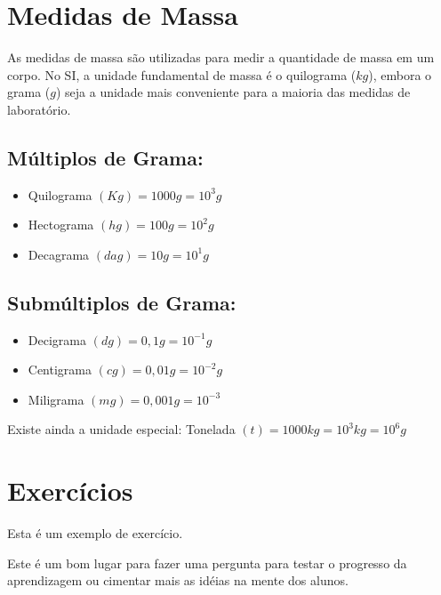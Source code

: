 \section{Medidas de Massa}
As medidas de massa são utilizadas para medir a quantidade
de massa em um corpo. No SI, a unidade fundamental de massa é
o quilograma ($kg$), embora o grama ($g$) seja a unidade mais
conveniente para a maioria das medidas de laboratório.
	\subsection{Múltiplos de Grama:}
		\begin{itemize}
		    \item Quilograma $(Kg) = 1000 g = 10^3 g$
		    \item Hectograma $(hg) = 100 g = 10^2 g$
		    \item Decagrama $(dag) = 10 g = 10^1 g$
		\end{itemize}
	
	\subsection{Submúltiplos de Grama:}
		\begin{itemize}
		    \item Decigrama $(dg) = 0,1 g = 10^{-1} g$
		    \item Centigrama $(cg) = 0,01 g = 10^{-2} g$
		    \item Miligrama $(mg) = 0,001 g = 10^{-3}$
		\end{itemize}
Existe ainda a unidade especial:
Tonelada $(t) = 1000 kg = 10^3 kg = 10^6 g$

\section{Exercícios}

Esta é um exemplo de exercício.
	\begin{exercise}
	Este é um bom lugar para fazer uma pergunta para testar o progresso da aprendizagem ou cimentar mais as idéias na mente dos alunos.
	\end{exercise}

